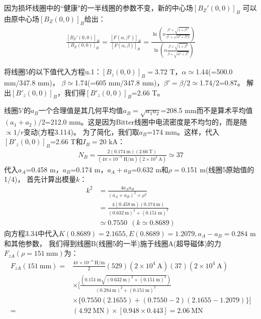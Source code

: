 因为损坏线圈中的``健康"的一半线圈的参数不变，新的中心场$[B_Z'(0,0)]_B$
可以由原中心场$[B_Z(0,0)]_B$给出：
\begin{align*}%
\frac{[B_Z'(0,0)]_B}{[B_Z(0,0)]_B}
=\frac{[F(\alpha,\beta')]_B}{[F(\alpha,\beta)]_B}
=\frac{\ln(\alpha\frac{\beta'+\sqrt{1+\beta'^2}}{\beta'+\sqrt{\alpha^2+\beta'2}})}{\ln(\alpha\frac{\beta+\sqrt{1+\beta^2}}{\beta+\sqrt{\alpha^2+\beta^2}})} \tag{u.1}
\end{align*}

将线圈5的以下值代入方程u.1：$[B_z(0,0)]_B=3.72$ T，$\alpha\simeq$1.44(=500.0 mm/347.8 mm)，
$\beta\simeq$1.74(=605 mm/347.8 mm)，$\beta'=\beta/2\simeq$1.74/2=0.87。
解出$[B'_z(0,0)]_B$，我们得$[B'_z(0,0)]_B$=2.66 T。

线圈5'的$a_B$一个合理值是其几何平均值$a_B=\sqrt{a_1 a_2}$=208.5 mm而不是算术平均值
$(a_1+a_2)/2$=212.0 mm。这是因为Bitter线圈中电流密度是不均匀的，而是随$\propto 1/r$变动(方程3.114)。
为了简化，我们取$a_B$=174 mm。这样，代入$[B'_z(0,0)]_B$=2.66 T和$I_B=$20 kA：
\begin{align*}%
N_B=\frac{2(0.174\ \mathrm{m})(2.66\ \mathrm{T})}{(4\pi\times 10^{-7}\ \mathrm{H/m})(2\times 10^4\ \mathrm{A})}\simeq 37
\end{align*}
代入$a_A$=0.458 m，$a_B$=0.174 m，$a_A+a_B$=0.632 m和$\rho=$0.151 m(线圈5原始值的1/4)，
首先计算出模量$k$：
\begin{align*}%
k^2&=\frac{4a_Aa_B}{(a_A+a_B)^2+\rho^2}\\ \tag{3.36}
&=\frac{4(0.458\ \mathrm{m})(0.174\ \mathrm{m})}{(0.632\ \mathrm{m})^2+(0.151\ \mathrm{m})^2}\\
&\simeq 0.7550\ \ (k\simeq 0.8689)
\end{align*}
向方程3.34中代入$K(0.8689)=2.1655, E(0.8689)=1.2079, a_A-a_B=0.284$ m和其他参数，
我们得到线圈B(线圈5的一半)施于线圈A(超导磁体)的力$F_{zA}(\rho=151\ \mathrm{mm})$为：
\begin{align*}%
F_{zA}(151\ \mathrm{mm})=&\frac{4\pi\times10^{-7}\ \mathrm{H/m}}{2}(529)(2\times 10^4\ \mathrm{A})(37)(2\times 10^4\ \mathrm{A})\\
&\times[\frac{(0.151\ \mathrm{m}\sqrt{(0.632\ \mathrm{m})^2+(0.151 \ \mathrm{m})^2})}{(0.284\ \mathrm{m})^2+(0.151\ \mathrm{m})^2}\\
&\times\{0.7550(2.1655)+(0.7550-2)(2.1655-1.2079)\}]\\
=&(4.92\ \mathrm{MN})\times[0.948\times 0.443]=2.06\ \mathrm{MN}
\end{align*}

